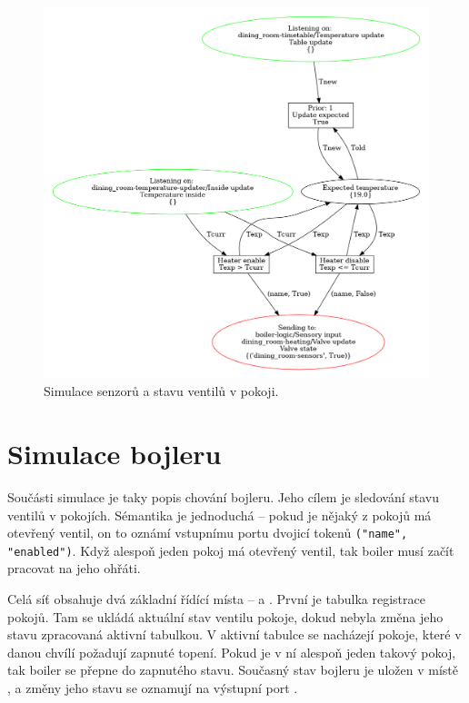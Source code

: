 \begin{figure}[htb]
 \centering
 \includegraphics[width=\textwidth]{obrazky-figures/room-sensors.png}
 \caption{Simulace senzorů a stavu ventilů v pokoji.}
 \label{sensor-viz}
\end{figure}


\section{Simulace bojleru}
\label{sec:boiler-net-details}

Součásti simulace je taky popis chování bojleru. Jeho cílem je sledování stavu ventilů v pokojích. Sémantika je jednoduchá -- pokud je nějaký z pokojů má otevřený ventil, on to oznámí vstupnímu portu  dvojicí tokenů \texttt{("name", "enabled")}. Když alespoň jeden pokoj má otevřený ventil, tak boiler musí začít pracovat na jeho ohřáti.

Celá síť obsahuje dvá základní řídící místa --  a . První je tabulka registrace pokojů. Tam se ukládá aktuální stav ventilu pokoje, dokud nebyla změna jeho stavu zpracovaná aktivní tabulkou. V aktivní tabulce se nacházejí pokoje, které v danou chvílí požadují zapnuté topení. Pokud je v ní alespoň jeden takový pokoj, tak boiler se přepne do zapnutého stavu. Současný stav bojleru je uložen v místě , a změny jeho stavu se oznamují na výstupní port .

